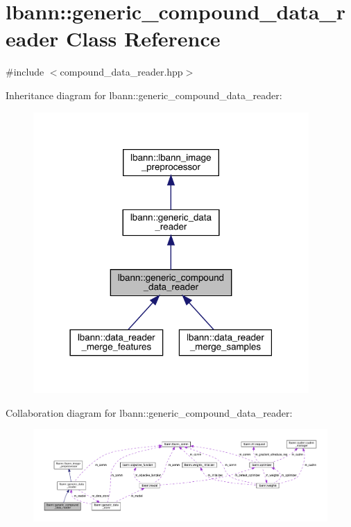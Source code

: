 \hypertarget{classlbann_1_1generic__compound__data__reader}{}\section{lbann\+:\+:generic\+\_\+compound\+\_\+data\+\_\+reader Class Reference}
\label{classlbann_1_1generic__compound__data__reader}


{\ttfamily \#include $<$compound\+\_\+data\+\_\+reader.\+hpp$>$}



Inheritance diagram for lbann\+:\+:generic\+\_\+compound\+\_\+data\+\_\+reader\+:\nopagebreak
\begin{figure}[H]
\begin{center}
\leavevmode
\includegraphics[width=298pt]{classlbann_1_1generic__compound__data__reader__inherit__graph}
\end{center}
\end{figure}


Collaboration diagram for lbann\+:\+:generic\+\_\+compound\+\_\+data\+\_\+reader\+:\nopagebreak
\begin{figure}[H]
\begin{center}
\leavevmode
\includegraphics[width=350pt]{classlbann_1_1generic__compound__data__reader__coll__graph}
\end{center}
\end{figure}
